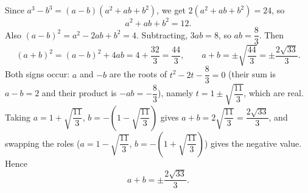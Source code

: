 Since $a^3-b^3=(a-b)\left(a^2+ab+b^2\right)$, we get $2\left(a^2+ab+b^2\right)=24$, so
\[a^2+ab+b^2=12.\]
Also $(a-b)^2=a^2-2ab+b^2=4$. Subtracting, $3ab=8$, so $ab=\dfrac83$. Then
\[(a+b)^2=(a-b)^2+4ab=4+\dfrac{32}{3}=\dfrac{44}{3},\qquad a+b=\pm\sqrt{\dfrac{44}{3}}=\pm\dfrac{2\sqrt{33}}{3}.\]
Both signs occur: $a$ and $-b$ are the roots of $t^2-2t-\dfrac83=0$ (their sum is $a-b=2$ and their product is $-ab=-\dfrac83$), namely $t=1\pm\sqrt{\dfrac{11}{3}}$, which are real. Taking $a=1+\sqrt{\dfrac{11}3}$, $b=-\left(1-\sqrt{\dfrac{11}3}\right)$ gives $a+b=2\sqrt{\dfrac{11}{3}}=\dfrac{2\sqrt{33}}{3}$, and swapping the roles ($a=1-\sqrt{\dfrac{11}3}$, $b=-\left(1+\sqrt{\dfrac{11}3}\right)$) gives the negative value. Hence
\[a+b=\boxed{\pm\dfrac{2\sqrt{33}}{3}}.\]

